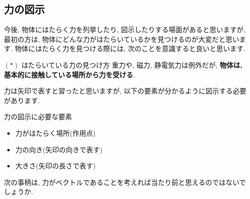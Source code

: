 \documentclass[11pt,dvipdfmx]{jsarticle}
\numberwithin{equation}{section} %
\begin{document}
\subsection{力の図示}\label{力の図示}
今後, 物体にはたらく力を列挙したり, 図示したりする場面があると思いますが, 最初の方は, 物体にどんな力がはたらいているかを見つけるのが大変だと思います. 物体にはたらく力を見つける際には, 次のことを意識すると良いと思います.
    \begin{freebox}{$(\ast)$ はたらいている力の見つけ方}
        重力や, 磁力, 静電気力は例外だが, \textbf{物体は, 基本的に接触している場所から力を受ける}. 
    \end{freebox}
力は矢印で表すと習ったと思いますが, 以下の要素が分かるように図示する必要があります.
\begin{freebox}{力の図示に必要な要素}
    \begin{itemize}
        \item 力がはたらく場所(作用点)
        \item 力の向き(矢印の向きで表す)
        \item 大きさ(矢印の長さで表す)
    \end{itemize}
\end{freebox}
次の事柄は, 力がベクトルであることを考えれば当たり前と思えるのではないでしょうか. 
\end{document}
